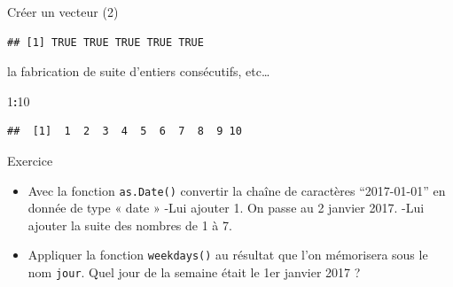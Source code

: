 \documentclass[
  ignorenonframetext,
]{beamer}
\newenvironment{Shaded}{\begin{snugshade}}{\end{snugshade}}
\newcommand{\DecValTok}[1]{\textcolor[rgb]{0.00,0.00,0.81}{#1}}
\newcommand{\SpecialCharTok}[1]{\textcolor[rgb]{0.81,0.36,0.00}{\textbf{#1}}}
\providecommand{\tightlist}{%
  \setlength{\itemsep}{0pt}\setlength{\parskip}{0pt}}
\begin{document}
\begin{frame}[fragile]{Créer un vecteur (2)}
\begin{verbatim}
## [1] TRUE TRUE TRUE TRUE TRUE
\end{verbatim}

\normalsize la fabrication de suite d'entiers consécutifs, etc\ldots{}

\tiny

\begin{Shaded}
\begin{Highlighting}[]
\DecValTok{1}\SpecialCharTok{:}\DecValTok{10}
\end{Highlighting}
\end{Shaded}

\begin{verbatim}
##  [1]  1  2  3  4  5  6  7  8  9 10
\end{verbatim}

\normalsize
\end{frame}

\begin{frame}[fragile]{Exercice}
\protect\hypertarget{exercice}{}
\begin{itemize}
\tightlist
\item
  Avec la fonction \texttt{as.Date()} convertir la chaîne de caractères
  ``2017-01-01'' en donnée de type « date » -Lui ajouter 1. On passe au
  2 janvier 2017. -Lui ajouter la suite des nombres de 1 à 7.
\item
  Appliquer la fonction \texttt{weekdays()} au résultat que l'on
  mémorisera sous le nom \texttt{jour}. Quel jour de la semaine était le
  1er janvier 2017 ?
\end{itemize}
\end{frame}
\end{document}
